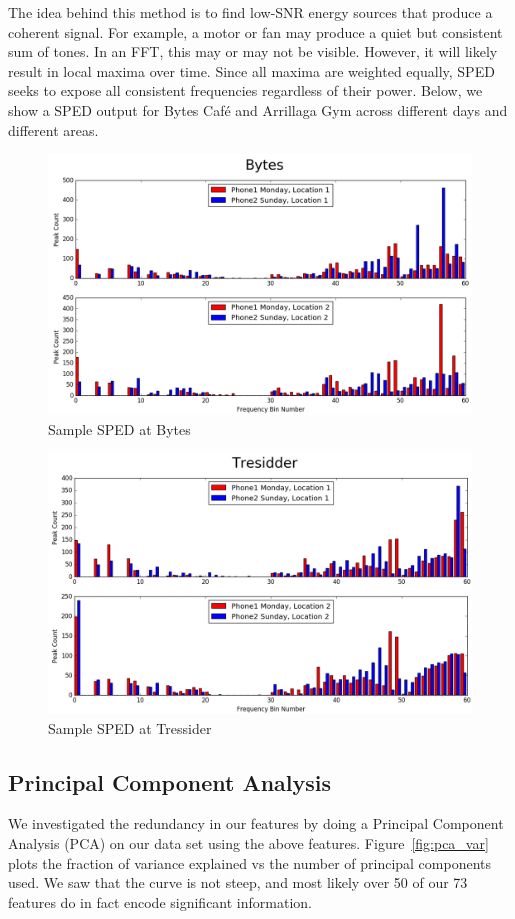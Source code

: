 \documentclass[journal]{IEEEtran}
\begin{document}
The idea behind this method is to find low-SNR energy sources that produce a coherent signal. For example, a motor or fan may produce a quiet but consistent sum of tones. In an FFT, this may or may not be visible. However, it will likely result in local maxima over time. Since all maxima are weighted equally, SPED seeks to expose all consistent frequencies regardless of their power. Below, we show a SPED output for Bytes Caf\'e and Arrillaga Gym across different days and different areas. 
\begin{figure}[H]
	\centering
	\includegraphics[width=0.9\linewidth]{bytes_sped}
	\caption{Sample SPED at Bytes}
	\label{fig:bytes_sped}
\end{figure}
\begin{figure}[H]
	\centering
	\includegraphics[width=0.9\linewidth]{tressider_sped}
	\caption{Sample SPED at Tressider}
	\label{fig:bytes_tressider}
\end{figure}

\subsection{Principal Component Analysis}
We investigated the redundancy in our features by doing a Principal Component Analysis (PCA) on our data set using the above features. Figure~\ref{fig:pca_var} plots the fraction of variance explained vs the number of principal components used. We saw that the curve is not steep, and most likely over 50 of our 73 features do in fact encode significant information.
\end{document}
